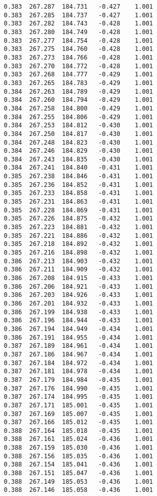 \begin{verbatim}
   0.383  267.287  184.731   -0.427    1.001
   0.383  267.285  184.737   -0.427    1.001
   0.383  267.282  184.743   -0.428    1.001
   0.383  267.280  184.749   -0.428    1.001
   0.383  267.277  184.754   -0.428    1.001
   0.383  267.275  184.760   -0.428    1.001
   0.383  267.273  184.766   -0.428    1.001
   0.383  267.270  184.772   -0.428    1.001
   0.383  267.268  184.777   -0.429    1.001
   0.383  267.265  184.783   -0.429    1.001
   0.384  267.263  184.789   -0.429    1.001
   0.384  267.260  184.794   -0.429    1.001
   0.384  267.258  184.800   -0.429    1.001
   0.384  267.255  184.806   -0.429    1.001
   0.384  267.253  184.812   -0.430    1.001
   0.384  267.250  184.817   -0.430    1.001
   0.384  267.248  184.823   -0.430    1.001
   0.384  267.246  184.829   -0.430    1.001
   0.384  267.243  184.835   -0.430    1.001
   0.384  267.241  184.840   -0.431    1.001
   0.385  267.238  184.846   -0.431    1.001
   0.385  267.236  184.852   -0.431    1.001
   0.385  267.233  184.858   -0.431    1.001
   0.385  267.231  184.863   -0.431    1.001
   0.385  267.228  184.869   -0.431    1.001
   0.385  267.226  184.875   -0.432    1.001
   0.385  267.223  184.881   -0.432    1.001
   0.385  267.221  184.886   -0.432    1.001
   0.385  267.218  184.892   -0.432    1.001
   0.385  267.216  184.898   -0.432    1.001
   0.386  267.213  184.903   -0.432    1.001
   0.386  267.211  184.909   -0.432    1.001
   0.386  267.208  184.915   -0.433    1.001
   0.386  267.206  184.921   -0.433    1.001
   0.386  267.203  184.926   -0.433    1.001
   0.386  267.201  184.932   -0.433    1.001
   0.386  267.199  184.938   -0.433    1.001
   0.386  267.196  184.944   -0.433    1.001
   0.386  267.194  184.949   -0.434    1.001
   0.386  267.191  184.955   -0.434    1.001
   0.387  267.189  184.961   -0.434    1.001
   0.387  267.186  184.967   -0.434    1.001
   0.387  267.184  184.972   -0.434    1.001
   0.387  267.181  184.978   -0.434    1.001
   0.387  267.179  184.984   -0.435    1.001
   0.387  267.176  184.990   -0.435    1.001
   0.387  267.174  184.995   -0.435    1.001
   0.387  267.171  185.001   -0.435    1.001
   0.387  267.169  185.007   -0.435    1.001
   0.387  267.166  185.012   -0.435    1.001
   0.388  267.164  185.018   -0.435    1.001
   0.388  267.161  185.024   -0.436    1.001
   0.388  267.159  185.030   -0.436    1.001
   0.388  267.156  185.035   -0.436    1.001
   0.388  267.154  185.041   -0.436    1.001
   0.388  267.151  185.047   -0.436    1.001
   0.388  267.149  185.053   -0.436    1.001
   0.388  267.146  185.058   -0.436    1.001

\end{verbatim}
